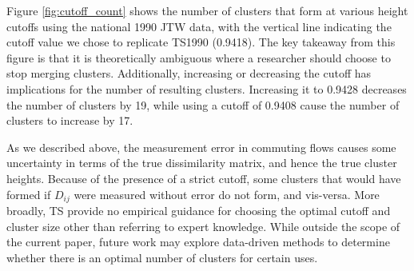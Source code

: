 Figure \ref{fig:cutoff_count} shows the number of clusters that form at various height cutoffs using the national 1990 JTW data, with the vertical line indicating the cutoff value we chose to replicate TS1990 (0.9418). The key takeaway from this figure is that it is theoretically ambiguous where a researcher should choose to stop merging clusters. Additionally, increasing or decreasing the cutoff has implications for the number of resulting clusters. Increasing it to 0.9428 decreases the number of clusters by 19, while using a cutoff of 0.9408 cause the number of clusters to increase by 17.

As we described above, the measurement error in commuting flows causes some uncertainty in terms of the true dissimilarity matrix, and hence the true cluster heights. Because of the presence of a strict cutoff, some clusters that would have formed if $D_{ij}$ were measured without error do not form, and vis-versa. More broadly, TS provide no empirical guidance for choosing the optimal cutoff and cluster size other than referring to expert knowledge. While outside the scope of the current paper, future work may explore data-driven methods to determine whether there is an optimal number of clusters for certain uses.

